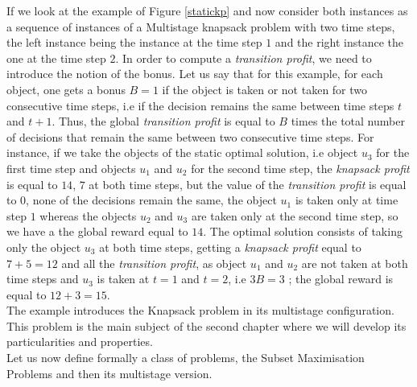 \documentclass[a4paper]{book}
\begin{document}
If we look at the example of Figure \ref{statickp} and now consider both instances as a sequence of instances of a {\sc Multistage knapsack} problem with two time steps, the left instance being the instance at the time step $1$ and the right instance the one at the time step $2$. In order to compute a \textit{transition profit}, we need to introduce the notion of the bonus. Let us say that for this example, for each object, one gets a bonus $B=1$ if the object is taken or not taken for two consecutive time steps, i.e if the decision remains the same between time steps $t$ and $t+1$. Thus, the global \textit{transition profit} is equal to $B$ times the total number of decisions that remain the same between two consecutive time steps. For instance, if we take the objects of the static optimal solution, i.e object $u_3$ for the first time step and objects $u_1$ and $u_2$ for the second time step, the \textit{knapsack profit} is equal to $14$, $7$ at both time steps, but the value of the \textit{transition profit} is equal to $0$, none of the decisions remain the same, the object $u_1$ is taken only at time step $1$ whereas the objects $u_2$ and $u_3$ are taken only at the second time step, so we have a the global reward equal to $14$. The optimal solution consists of taking only the object $u_3$ at both time steps, getting a \textit{knapsack profit} equal to $7+5=12$ and all the \textit{transition profit}, as object $u_1$ and $u_2$ are not taken at both time steps and $u_3$ is taken at $t=1$ and $t=2$, i.e $3B = 3$ ; the global
reward is equal to $12+3=15$.\\

The example introduces the {\sc Knapsack} problem in its multistage configuration. This problem is the main subject of the second chapter where we will develop its particularities and properties.\\

Let us now define formally a class of problems, the Subset Maximisation Problems and then its multistage version.
\end{document}
